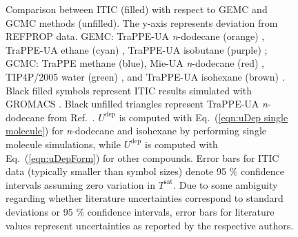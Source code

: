 \documentclass[5p,times]{elsarticle}
\begin{document}
\begin{figure}[]
\caption{Comparison between ITIC (filled) with respect to GEMC and GCMC methods (unfilled). The y-axis represents deviation from REFPROP data. 
GEMC: TraPPE-UA \textit{n}-dodecane  (orange) \cite{Martin1998}, TraPPE-UA ethane (cyan) \cite{Martin1998}, TraPPE-UA isobutane (purple) \cite{Wick2000};
GCMC: TraPPE methane\cite{Shen2008} (blue), Mie-UA \textit{n}-dodecane (red) \cite{Potoff2009}, TIP4P/2005 water (green) \cite{Shen2008}, and TraPPE-UA isohexane (brown) \cite{Mick2017}. Black filled symbols represent ITIC results simulated with GROMACS \cite{Lindahl2001}. Black unfilled triangles represent TraPPE-UA \textit{n}-dodecane from Ref.~\cite{Ungerer2000}. $U^\mathrm{dep}$ is computed with Eq.~(\ref{eqn:uDep single molecule}) for \textit{n}-dodecane and isohexane by performing single molecule simulations, while $U^\mathrm{dep}$ is computed with Eq.~(\ref{eqn:uDepForm}) for other compounds. Error bars for ITIC data (typically smaller than symbol sizes) denote 95 \% confidence intervals assuming zero variation in $T^\mathrm{sat}$. Due to some ambiguity regarding whether literature uncertainties correspond to standard deviations or 95 \% confidence intervals, error bars for literature values represent uncertainties as reported by the respective authors.
}
\label{fig:EXAMPLE-SIM/Deviation-Psat-rhoL-rhoV}
\end{figure}
\end{document}

